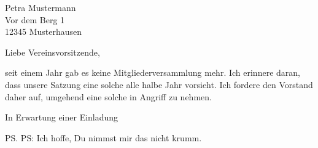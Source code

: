 \documentclass[foldmarks=true,foldmarks=blmtP, fromalign=false,
version=last]{scrlttr2}
\begin{document}
   
  \begin{letter}{%
Petra Mustermann\\ Vor dem Berg 1\\ 12345 Musterhausen%
}
\opening{Liebe Vereinsvorsitzende,}
seit einem Jahr gab es keine Mitgliederversammlung mehr. Ich erinnere daran, dass unsere Satzung eine solche alle halbe Jahr vorsieht. Ich fordere den Vorstand daher auf, umgehend eine solche in Angriff zu nehmen.
\closing{In Erwartung einer Einladung}
\ps PS: Ich hoffe, Du nimmst mir das nicht krumm. 
  \end{letter}
\end{document}
